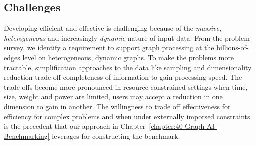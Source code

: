 \subsection{\gai Challenges}
Developing efficient and effective \gai is challenging because of the \textit{massive, heterogeneous} and increasingly \textit{dynamic} nature of input data. 
From the problem survey, we identify a requirement to support graph processing at the billions-of-edges level on heterogeneous, dynamic graphs.
To make the problems more tractable, simplification approaches to the data like sampling and dimensionality reduction trade-off completeness of information to gain processing speed.
The trade-offs become more pronounced in resource-constrained settings when time, size, weight and power are limited, users may accept a reduction in one dimension to gain in another. 
The willingness to trade off effectiveness for efficiency for complex problems and when under externally imporsed constraints is the precedent that our approach in Chapter~\ref{chapter:40-Graph-AI-Benchmarking} leverages for constructing the benchmark. 




